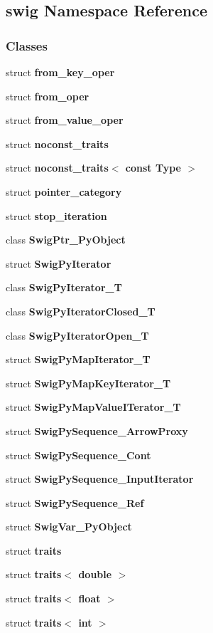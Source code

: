 \subsection{swig Namespace Reference}
\label{namespaceswig}
\subsubsection*{Classes}
\begin{DoxyCompactItemize}
\item 
struct {\bf from\+\_\+key\+\_\+oper}
\item 
struct {\bf from\+\_\+oper}
\item 
struct {\bf from\+\_\+value\+\_\+oper}
\item 
struct {\bf noconst\+\_\+traits}
\item 
struct {\bf noconst\+\_\+traits$<$ const Type $>$}
\item 
struct {\bf pointer\+\_\+category}
\item 
struct {\bf stop\+\_\+iteration}
\item 
class {\bf Swig\+Ptr\+\_\+\+Py\+Object}
\item 
struct {\bf Swig\+Py\+Iterator}
\item 
class {\bf Swig\+Py\+Iterator\+\_\+T}
\item 
class {\bf Swig\+Py\+Iterator\+Closed\+\_\+T}
\item 
class {\bf Swig\+Py\+Iterator\+Open\+\_\+T}
\item 
struct {\bf Swig\+Py\+Map\+Iterator\+\_\+T}
\item 
struct {\bf Swig\+Py\+Map\+Key\+Iterator\+\_\+T}
\item 
struct {\bf Swig\+Py\+Map\+Value\+I\+Terator\+\_\+T}
\item 
struct {\bf Swig\+Py\+Sequence\+\_\+\+Arrow\+Proxy}
\item 
struct {\bf Swig\+Py\+Sequence\+\_\+\+Cont}
\item 
struct {\bf Swig\+Py\+Sequence\+\_\+\+Input\+Iterator}
\item 
struct {\bf Swig\+Py\+Sequence\+\_\+\+Ref}
\item 
struct {\bf Swig\+Var\+\_\+\+Py\+Object}
\item 
struct {\bf traits}
\item 
struct {\bf traits$<$ double $>$}
\item 
struct {\bf traits$<$ float $>$}
\item 
struct {\bf traits$<$ int $>$}
\item 

\end{DoxyCompactItemize}
